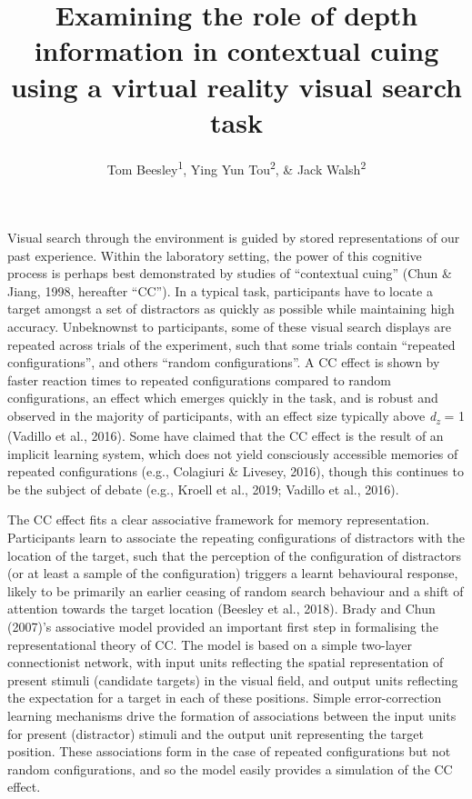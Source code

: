 \documentclass[
  man,floatsintext]{apa7}
\title{Examining the role of depth information in contextual cuing using a virtual reality visual search task}
\author{Tom Beesley\textsuperscript{1}, Ying Yun Tou\textsuperscript{2}, \& Jack Walsh\textsuperscript{2}}
\date{}
\affiliation{\vspace{0.5cm}\textsuperscript{1} Lancaster University, UK\\\textsuperscript{2} UNSW Sydney, Australia}
\begin{document}
\maketitle

Visual search through the environment is guided by stored representations of our past experience. Within the laboratory setting, the power of this cognitive process is perhaps best demonstrated by studies of ``contextual cuing'' (Chun \& Jiang, 1998, hereafter ``CC''). In a typical task, participants have to locate a target amongst a set of distractors as quickly as possible while maintaining high accuracy. Unbeknownst to participants, some of these visual search displays are repeated across trials of the experiment, such that some trials contain ``repeated configurations'', and others ``random configurations''. A CC effect is shown by faster reaction times to repeated configurations compared to random configurations, an effect which emerges quickly in the task, and is robust and observed in the majority of participants, with an effect size typically above \emph{d\textsubscript{z}} = 1 (Vadillo et al., 2016). Some have claimed that the CC effect is the result of an implicit learning system, which does not yield consciously accessible memories of repeated configurations (e.g., Colagiuri \& Livesey, 2016), though this continues to be the subject of debate (e.g., Kroell et al., 2019; Vadillo et al., 2016).

The CC effect fits a clear associative framework for memory representation. Participants learn to associate the repeating configurations of distractors with the location of the target, such that the perception of the configuration of distractors (or at least a sample of the configuration) triggers a learnt behavioural response, likely to be primarily an earlier ceasing of random search behaviour and a shift of attention towards the target location (Beesley et al., 2018). Brady and Chun (2007)'s associative model provided an important first step in formalising the representational theory of CC. The model is based on a simple two-layer connectionist network, with input units reflecting the spatial representation of present stimuli (candidate targets) in the visual field, and output units reflecting the expectation for a target in each of these positions. Simple error-correction learning mechanisms drive the formation of associations between the input units for present (distractor) stimuli and the output unit representing the target position. These associations form in the case of repeated configurations but not random configurations, and so the model easily provides a simulation of the CC effect.
\end{document}
